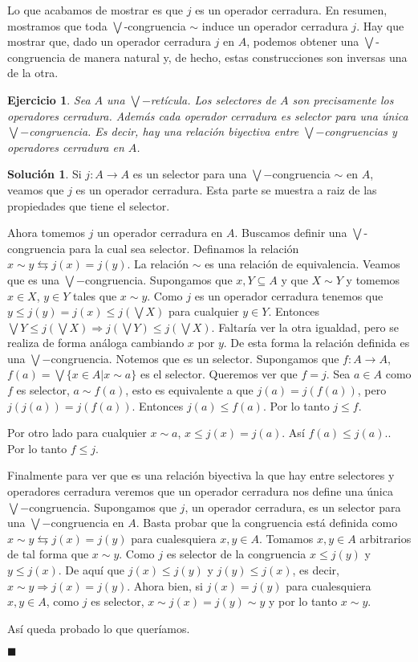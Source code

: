 \documentclass[12pt,letterpaper,titlepage]{article}
\newcommand{\xqed}[1]{%
  \leavevmode\unskip\penalty9999 \hbox{}\nobreak\hfill
  \quad\hbox{\ensuremath{#1}}}
\newtheorem{exe}{Ejercicio}
\theoremstyle{definition}
\newtheorem*{soltemp}{Solución}
\newenvironment{sol}[1]{%
    \begin{soltemp}#1}{%
    \xqed{\blacksquare}\end{soltemp}%
}
\newcommand\Sup{\bigvee}
\newcommand\simr{{\sim}}
\newcommand\<{\langle}
\renewcommand\>{\rangle}
\begin{document}
Lo que acabamos de mostrar es que $j$ es un operador cerradura.
En resumen, mostramos que toda $\Sup$-congruencia $\simr$ induce
un operador cerradura $j$.
Hay que mostrar que, dado un operador cerradura $j$ en $A$, podemos obtener una
$\Sup$-congruencia de manera natural y, de hecho, estas construcciones son
inversas una de la otra.
\begin{exe}%
    Sea $A$ una $\Sup-$retícula. Los selectores de $A$ son precisamente los operadores cerradura. Además cada operador cerradura es selector para una única $\Sup-$congruencia. Es decir, hay una relación biyectiva entre $\Sup-$congruencias y operadores cerradura en $A$.
\end{exe}

\begin{sol}
    Si $j:A\to A$ es un selector para una $\Sup-$congruencia $\simr$ en $A$, veamos que $j$ es un operador cerradura. Esta parte se muestra a raiz de las propiedades que tiene el selector.
    
    Ahora tomemos $j$ un operador cerradura en $A$. Buscamos definir una $\Sup$-congruencia para la cual sea selector. Definamos la relación $x\simr y\leftrightarrows j(x)=j(y)$. La relación $\simr$ es una relación de equivalencia. Veamos que es una $\Sup-$congruencia. Supongamos que $x,Y\subseteq A$ y que $X\simr Y$ y tomemos $x\in X$, $y\in Y$ tales que $x\simr y$. Como $j$ es un operador cerradura tenemos que $y\leq j(y)=j(x)\leq j(\Sup X)$ para cualquier $y\in Y$. Entonces $\Sup Y\leq j(\Sup X)\Rightarrow j(\Sup Y)\leq j(\Sup X)$. Faltaría ver la otra igualdad, pero se realiza de forma análoga cambiando $x$ por $y$. De esta forma la relación definida es una $\Sup-$congruencia. Notemos que es un selector. Supongamos que $f:A\to A$, $f(a)=\Sup\{x\in A|x\simr a\}$ es el selector. Queremos ver que $f=j$. Sea $a\in A$ como $f$ es selector, $a\simr f(a)$, esto es equivalente a que $j(a)=j(f(a))$, pero $j(j(a))=j(f(a))$. Entonces $j(a)\leq f(a)$. Por lo tanto $j\leq f$.
    
    Por otro lado para cualquier $x\simr a$, $x\leq j(x)=j(a)$. Así $f(a)\leq j(a)$.. Por lo tanto $f\leq j$.
    
    Finalmente para ver que es una relación biyectiva la que hay entre selectores y operadores cerradura veremos que un operador cerradura nos define una única $\Sup-$congruencia. Supongamos que $j$, un operador cerradura, es un selector para una $\Sup-$congruencia en $A$. Basta probar que la congruencia está definida como $x\simr y\leftrightarrows j(x)=j(y)$ para cualesquiera $x,y\in A$. Tomamos $x,y\in A$ arbitrarios de tal forma que $x\simr y$. Como $j$ es selector de la congruencia $x\leq j(y)$ y $y\leq j(x)$. De aquí que $j(x)\leq j(y)$ y $j(y)\leq j(x)$, es decir, $x\simr y\Rightarrow j(x)=j(y)$. Ahora bien, si $j(x)=j(y)$ para cualesquiera $x, y\in A$, como $j$ es selector, $x\simr j(x)=j(y)\simr y$ y por lo tanto $x\simr y$.
    
    Así queda probado lo que queríamos.
    
\end{sol}
\end{document}

